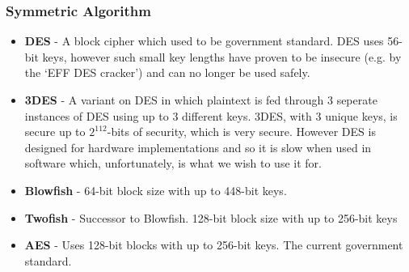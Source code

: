 \documentclass[12pt, titlepage]{article}
\begin{document}
\subsubsection{Symmetric Algorithm}
\begin{itemize}
	\item \textbf{DES} - A block cipher which used to be government standard. DES uses 56-bit keys, however such small key lengths have proven to be insecure (e.g. by the `EFF DES cracker') and can no longer be used safely.
	\item \textbf{3DES} - A variant on DES in which plaintext is fed through 3 seperate instances of DES using up to 3 different keys. 3DES, with 3 unique keys, is secure up to $2^{112}$-bits of security, which is very secure. However DES is designed for hardware implementations and so it is slow when used in software which, unfortunately, is what we wish to use it for.
	\item \textbf{Blowfish} - 64-bit block size with up to 448-bit keys.
	\item \textbf{Twofish} - Successor to Blowfish. 128-bit block size with up to 256-bit keys
	\item \textbf{AES} - Uses 128-bit blocks with up to 256-bit keys. The current government standard.
\end{itemize}
\end{document}
